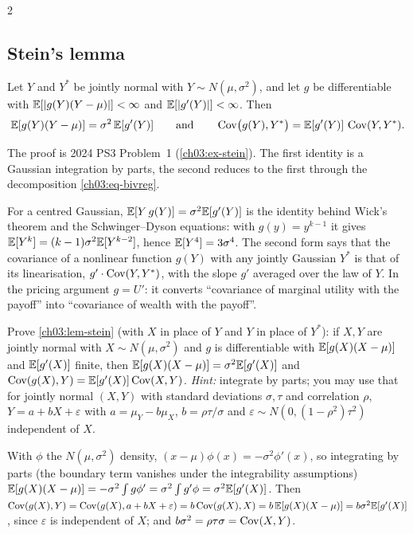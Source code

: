 \begin{paracol}{2}
\subsection{Stein's lemma}
\begin{lemma}[Stein]\label{ch03:lem-stein}
Let $Y$ and $Y^*$ be jointly normal with $Y\sim N(\mu,\sigma^2)$, and let $g$ be differentiable with
$\mathbb{E}[|g(Y)(Y-\mu)|]<\infty$ and $\mathbb{E}[|g'(Y)|]<\infty$. Then 
\[
  \mathbb{E}[g(Y)(Y-\mu)]=\sigma^2\,\mathbb{E}[g'(Y)]\qquad\text{and}\qquad \operatorname{Cov}\bigl(g(Y),Y^*\bigr)=\mathbb{E}[g'(Y)]\,\operatorname{Cov}(Y,Y^*).
\]
\end{lemma}
\noindent The proof is 2024 PS3 Problem~1 (\cref{ch03:ex-stein}). The first identity is a Gaussian integration
by parts, the second reduces to the first through the decomposition \eqref{ch03:eq-bivreg}.

\begin{intuition}
For a centred Gaussian, $\mathbb{E}[Y\,g(Y)]=\sigma^2\mathbb{E}[g'(Y)]$ is the identity behind Wick's theorem and the
Schwinger--Dyson equations: with $g(y)=y^{k-1}$ it gives $\mathbb{E}[Y^k]=(k-1)\sigma^2\mathbb{E}[Y^{k-2}]$, hence $\mathbb{E}[Y^4]=3\sigma^4$. The second
form says that the covariance of a nonlinear function $g(Y)$ with any jointly Gaussian $Y^*$ is that of its
linearisation, $g'\cdot\operatorname{Cov}(Y,Y^*)$, with the slope $g'$ averaged over the law of $Y$. In the pricing argument
$g=U'$: it converts ``covariance of marginal utility with the payoff'' into ``covariance of wealth with the
payoff''.
\end{intuition}

\begin{exercise}\label{ch03:ex-stein}
Prove \cref{ch03:lem-stein} (with $X$ in place of $Y$ and $Y$ in place of $Y^*$): if $X,Y$ are jointly normal with
$X\sim N(\mu,\sigma^2)$ and $g$ is differentiable with $\mathbb{E}[g(X)(X-\mu)]$ and $\mathbb{E}[g'(X)]$ finite, then
$\mathbb{E}[g(X)(X-\mu)]=\sigma^2\mathbb{E}[g'(X)]$ and $\operatorname{Cov}(g(X),Y)=\mathbb{E}[g'(X)]\operatorname{Cov}(X,Y)$.
\emph{Hint:} integrate by parts; you may use that for jointly normal $(X,Y)$ with standard deviations $\sigma,\tau$ and
correlation $\rho$, $Y=a+bX+\varepsilon$ with $a=\mu_Y-b\mu_X$, $b=\rho\tau/\sigma$ and $\varepsilon\sim N(0,(1-\rho^2)\tau^2)$ independent of $X$.
\end{exercise}
\begin{solution}[ch03:ex-stein]
With $\phi$ the $N(\mu,\sigma^2)$ density, $(x-\mu)\phi(x)=-\sigma^2\phi'(x)$, so integrating by parts (the boundary term vanishes
under the integrability assumptions) $\mathbb{E}[g(X)(X-\mu)]=-\sigma^2\int g\phi'=\sigma^2\int g'\phi=\sigma^2\mathbb{E}[g'(X)]$.
Then $\operatorname{Cov}(g(X),Y)=\operatorname{Cov}(g(X),a+bX+\varepsilon)=b\operatorname{Cov}(g(X),X)=b\,\mathbb{E}[g(X)(X-\mu)]=b\sigma^2\mathbb{E}[g'(X)]$, since $\varepsilon$ is independent of
$X$; and $b\sigma^2=\rho\tau\sigma=\operatorname{Cov}(X,Y)$.
\end{solution}


\end{paracol}
